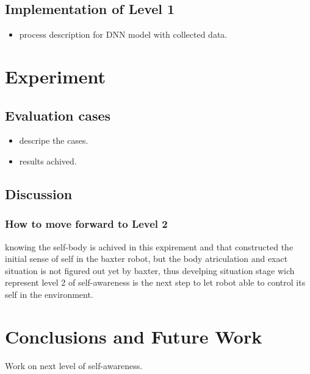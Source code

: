 \documentclass[12pt]{article}
\begin{document}
\subsection{Implementation of Level 1}
\begin{itemize}
\item process description for DNN model with collected data.
\end{itemize}
\section{Experiment}
\subsection{Evaluation cases}
\begin{itemize}
\item descripe the cases.
\item results achived.
\end{itemize}
\subsection{Discussion}
\subsubsection{How to move forward to Level 2}
knowing the self-body is achived in this expirement and that constructed the initial sense of self in the baxter robot, but the body atriculation and exact situation is not figured out yet by baxter, thus develping situation stage wich represent level 2 of self-awareness is the next step to let robot able to control its self in the environment.

\section{Conclusions and Future Work}
Work on next level of self-awareness.
\end{document}
